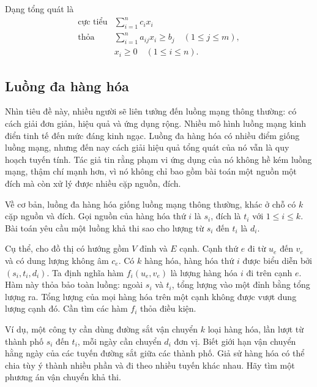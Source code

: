 \documentclass[11pt]{article}
\begin{document}
Dạng tổng quát là
\[
\begin{array}{ll}
\text{cực tiểu} & \displaystyle\sum_{i=1}^{n} c_ix_i\\
\text{thỏa} & \displaystyle\sum_{i=1}^{n} a_{ij}x_i\ge b_j
              \quad (1\le j\le m),\\
& x_i\ge 0\quad (1\le i\le n).
\end{array}
\]

\subsection{Luồng đa hàng hóa}

Nhìn tiêu đề này, nhiều người sẽ liên tưởng đến luồng mạng thông thường: có
cách giải đơn giản, hiệu quả và ứng dụng rộng. Nhiều mô hình luồng mạng kinh
điển tinh tế đến mức đáng kinh ngạc. Luồng đa hàng hóa có nhiều điểm giống
luồng mạng, nhưng đến nay cách giải hiệu quả tổng quát của nó vẫn là quy
hoạch tuyến tính. Tác giả tin rằng phạm vi ứng dụng của nó không hề kém
luồng mạng, thậm chí mạnh hơn, vì nó không chỉ bao gồm bài toán một nguồn
một đích mà còn xử lý được nhiều cặp nguồn, đích.

Về cơ bản, luồng đa hàng hóa giống luồng mạng thông thường, khác ở chỗ có
$k$ cặp nguồn và đích. Gọi nguồn của hàng hóa thứ $i$ là $s_i$, đích là
$t_i$ với $1\le i\le k$. Bài toán yêu cầu một luồng khả thi sao cho lượng từ
$s_i$ đến $t_i$ là $d_i$.

Cụ thể, cho đồ thị có hướng gồm $V$ đỉnh và $E$ cạnh. Cạnh thứ $e$ đi từ
$u_e$ đến $v_e$ và có dung lượng không âm $c_e$. Có $k$ hàng hóa, hàng hóa
thứ $i$ được biểu diễn bởi $(s_i,t_i,d_i)$. Ta định nghĩa hàm
$f_i(u_e,v_e)$ là lượng hàng hóa $i$ đi trên cạnh $e$. Hàm này thỏa bảo toàn
luồng: ngoài $s_i$ và $t_i$, tổng lượng vào một đỉnh bằng tổng lượng ra. Tổng
lượng của mọi hàng hóa trên một cạnh không được vượt dung lượng cạnh đó. Cần
tìm các hàm $f_i$ thỏa điều kiện.

Ví dụ, một công ty cần dùng đường sắt vận chuyển $k$ loại hàng hóa, lần lượt
từ thành phố $s_i$ đến $t_i$, mỗi ngày cần chuyển $d_i$ đơn vị. Biết giới hạn
vận chuyển hằng ngày của các tuyến đường sắt giữa các thành phố. Giả sử hàng
hóa có thể chia tùy ý thành nhiều phần và đi theo nhiều tuyến khác nhau. Hãy
tìm một phương án vận chuyển khả thi.
\end{document}
